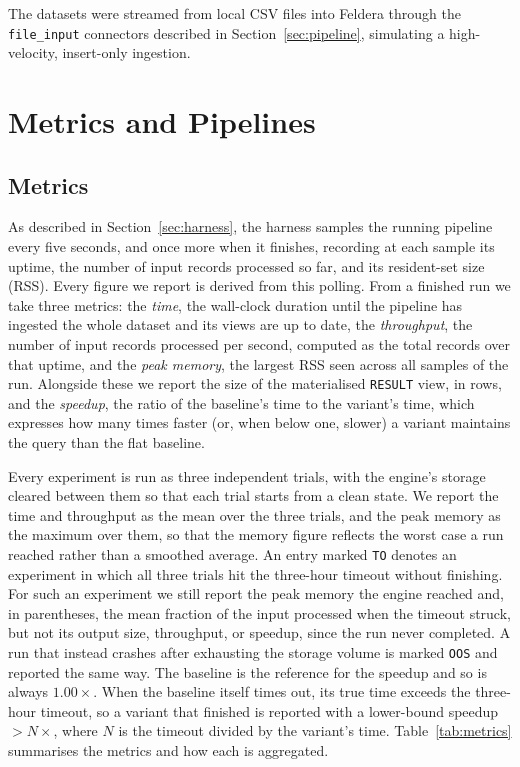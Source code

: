 The datasets were streamed from local CSV files into Feldera through the \texttt{file\_input} connectors described in Section~\ref{sec:pipeline}, simulating a high-velocity, insert-only ingestion.

\section{Metrics and Pipelines}
\label{sec:methodology}

\subsection{Metrics}

As described in Section~\ref{sec:harness}, the harness samples the running pipeline every five seconds, and once more when it finishes, recording at each sample its uptime, the number of input records processed so far, and its resident-set size (RSS).
Every figure we report is derived from this polling.
From a finished run we take three metrics: the \emph{time}, the wall-clock duration until the pipeline has ingested the whole dataset and its views are up to date, the \emph{throughput}, the number of input records processed per second, computed as the total records over that uptime, and the \emph{peak memory}, the largest RSS seen across all samples of the run.
Alongside these we report the size of the materialised \texttt{RESULT} view, in rows, and the \emph{speedup}, the ratio of the baseline's time to the variant's time, which expresses how many times faster (or, when below one, slower) a variant maintains the query than the flat baseline.

Every experiment is run as three independent trials, with the engine's storage cleared between them so that each trial starts from a clean state.
We report the time and throughput as the mean over the three trials, and the peak memory as the maximum over them, so that the memory figure reflects the worst case a run reached rather than a smoothed average.
An entry marked \texttt{TO} denotes an experiment in which all three trials hit the three-hour timeout without finishing.
For such an experiment we still report the peak memory the engine reached and, in parentheses, the mean fraction of the input processed when the timeout struck, but not its output size, throughput, or speedup, since the run never completed. A run that instead crashes after exhausting the storage volume is marked \texttt{OOS} and reported the same way.
The baseline is the reference for the speedup and so is always $1.00\times$. When the baseline itself times out, its true time exceeds the three-hour timeout, so a variant that finished is reported with a lower-bound speedup $>\!N\times$, where $N$ is the timeout divided by the variant's time.
Table~\ref{tab:metrics} summarises the metrics and how each is aggregated.

